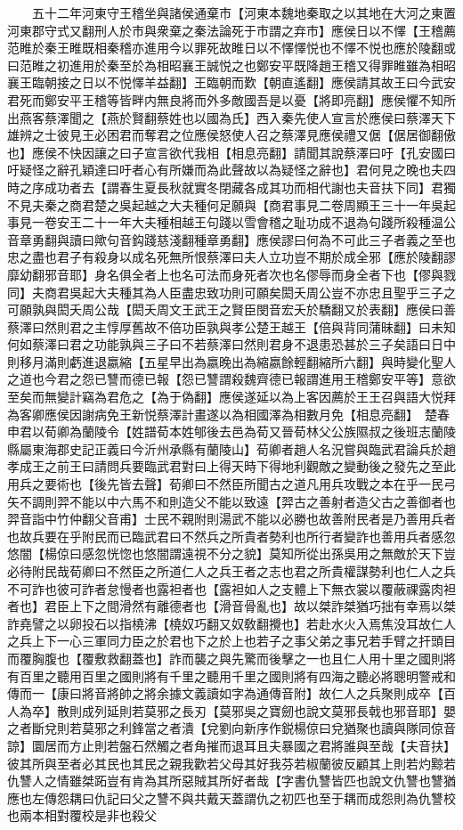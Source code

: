 　　五十二年河東守王稽坐與諸侯通棄市【河東本魏地秦取之以其地在大河之東置河東郡守式又翻刑人於市與衆棄之秦法論死于市謂之弃市】應侯日以不懌【王稽薦范睢於秦王睢既相秦稽亦進用今以罪死故睢日以不懌懌悦也不懌不悦也應於陵翻或曰范睢之初進用於秦至於為相昭襄王誠悦之也鄭安平既降趙王稽又得罪睢雖為相昭襄王臨朝接之日以不悦懌羊益翻】王臨朝而歎【朝直遙翻】應侯請其故王曰今武安君死而鄭安平王稽等皆畔内無良將而外多敵國吾是以憂【將即亮翻】應侯懼不知所出燕客蔡澤聞之【燕於賢翻蔡姓也以國為氏】西入秦先使人宣言於應侯曰蔡澤天下雄辨之士彼見王必困君而奪君之位應侯怒使人召之蔡澤見應侯禮又倨【倨居御翻傲也】應侯不快因讓之曰子宣言欲代我相【相息亮翻】請聞其說蔡澤曰吁【孔安國曰吁疑怪之辭孔穎達曰吁者心有所嫌而為此聲故以為疑怪之辭也】君何見之晚也夫四時之序成功者去【謂春生夏長秋就實冬閉藏各成其功而相代謝也夫音扶下同】君獨不見夫秦之商君楚之吳起越之大夫種何足願與【商君事見二卷周顯王三十一年吳起事見一卷安王二十一年大夫種相越王句踐以雪會稽之耻功成不退為句踐所殺種温公音章勇翻與讀曰歟句音鈎踐慈淺翻種章勇翻】應侯謬曰何為不可此三子者義之至也忠之盡也君子有殺身以成名死無所恨蔡澤曰夫人立功豈不期於成全邪【應於陵翻謬靡幼翻邪音耶】身名俱全者上也名可法而身死者次也名僇辱而身全者下也【僇與戮同】夫商君吳起大夫種其為人臣盡忠致功則可願矣閎夭周公豈不亦忠且聖乎三子之可願孰與閎夭周公哉【閎夭周文王武王之賢臣閔音宏夭於驕翻又於表翻】應侯曰善蔡澤曰然則君之主惇厚舊故不倍功臣孰與孝公楚王越王【倍與背同蒲昧翻】曰未知何如蔡澤曰君之功能孰與三子曰不若蔡澤曰然則君身不退患恐甚於三子矣語曰日中則移月滿則虧進退嬴縮【五星早出為嬴晚出為縮嬴餘輕翻縮所六翻】與時變化聖人之道也今君之怨已讐而德已報【怨已讐謂殺魏齊德已報謂進用王稽鄭安平等】意欲至矣而無變計竊為君危之【為于偽翻】應侯遂延以為上客因薦於王王召與語大悦拜為客卿應侯因謝病免王新悦蔡澤計畫遂以為相國澤為相數月免【相息亮翻】　楚春申君以荀卿為蘭陵令【姓譜荀本姓郇後去邑為荀又晉荀林父公族隰叔之後班志蘭陵縣屬東海郡史記正義曰今沂州承縣有蘭陵山】荀卿者趙人名況嘗與臨武君論兵於趙孝成王之前王曰請問兵要臨武君對曰上得天時下得地利觀敵之變動後之發先之至此用兵之要術也【後先皆去聲】荀卿曰不然臣所聞古之道凡用兵攻戰之本在乎一民弓矢不調則羿不能以中六馬不和則造父不能以致遠【羿古之善射者造父古之善御者也羿音詣中竹仲翻父音甫】士民不親附則湯武不能以必勝也故善附民者是乃善用兵者也故兵要在乎附民而已臨武君曰不然兵之所貴者勢利也所行者變詐也善用兵者感忽悠闇【楊倞曰感忽恍惚也悠闇謂遠視不分之貌】莫知所從出孫吳用之無敵於天下豈必待附民哉荀卿曰不然臣之所道仁人之兵王者之志也君之所貴權謀勢利也仁人之兵不可詐也彼可詐者怠慢者也露袒者也【露袒如人之支體上下無衣裳以覆蔽祼露肉袒者也】君臣上下之間滑然有離德者也【滑音骨亂也】故以桀詐桀猶巧拙有幸焉以桀詐堯譬之以卵投石以指橈沸【橈奴巧翻又奴敎翻攪也】若赴水火入焉焦没耳故仁人之兵上下一心三軍同力臣之於君也下之於上也若子之事父弟之事兄若手臂之扞頭目而覆胸腹也【覆敷救翻蓋也】詐而襲之與先驚而後擊之一也且仁人用十里之國則將有百里之聽用百里之國則將有千里之聽用千里之國則將有四海之聽必將聰明警戒和傳而一【康曰將音將帥之將余據文義讀如字為通傳音附】故仁人之兵聚則成卒【百人為卒】散則成列延則若莫邪之長刃【莫邪吳之寶劒也說文莫邪長戟也邪音耶】嬰之者斷兌則若莫邪之利鋒當之者潰【兌劉向新序作鋭楊倞曰兌猶聚也讀與隊同倞音諒】圜居而方止則若盤石然觸之者角摧而退耳且夫暴國之君將誰與至哉【夫音扶】彼其所與至者必其民也其民之親我歡若父母其好我芬若椒蘭彼反顧其上則若灼黥若仇讐人之情雖桀跖豈有肯為其所惡賊其所好者哉【字書仇讐皆匹也說文仇讐也讐猶應也左傳怨耦曰仇記曰父之讐不與共戴天蓋謂仇之初匹也至于耦而成怨則為仇讐校也兩本相對覆校是非也殺父